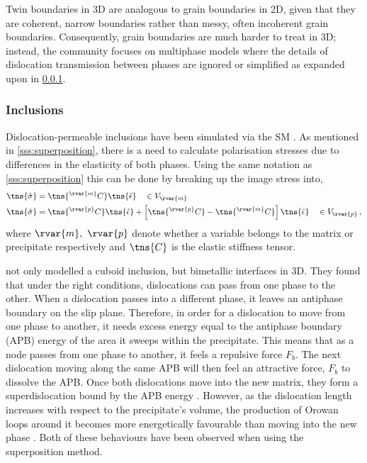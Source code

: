 Twin boundaries in 3D are analogous to grain boundaries in 2D, given that they are coherent, narrow boundaries rather than messy, often incoherent grain boundaries. Consequently, grain boundaries are much harder to treat in 3D; instead, the community focuses on multiphase models where the details of dislocation transmission between phases are ignored or simplified as expanded upon in \cref{sss:inclusions}.

\subsubsection{Inclusions}
\label{sss:inclusions}

Dislocation-permeable inclusions have been simulated via the SM \cite{sm_incl}. As mentioned in \cref{sss:superposition}, there is a need to calculate polarisation stresses due to differences in the elasticity of both phases. Using the same notation as \cref{sss:superposition} this can be done by breaking up the image stress into,
\begin{subequations}
    \begin{align}\label{eq:sm_pol_stress}
        \tns{\hat{\sigma}} & = \tns{^{\rvar{m}}C} \tns{\hat{\epsilon}} \quad \in V_{\rvar{m}}                                                                                  \\
        \tns{\hat{\sigma}} & = \tns{^{\rvar{p}}C} \tns{\hat{\epsilon}} + \left[\tns{^{\rvar{p}}C} - \tns{^{\rvar{m}}C}\right] \tns{\tilde{\epsilon}} \quad \in V_{\rvar{p}}\,,
    \end{align}
\end{subequations}
where $ \rvar{m},~\rvar{p} $ denote whether a variable belongs to the matrix or precipitate respectively and $ \tns{C} $ is the elastic stiffness tensor.

 not only modelled a cuboid inclusion, but bimetallic interfaces in 3D. They found that under the right conditions, dislocations can pass from one phase to the other. When a dislocation passes into a different phase, it leaves an antiphase boundary on the slip plane. Therefore, in order for a dislocation to move from one phase to another, it needs excess energy equal to the antiphase boundary (APB) energy of the area it sweeps within the precipitate. This means that as a node passes from one phase to another, it feels a repulsive force $ F_{b} $. The next dislocation moving along the same APB will then feel an attractive force, $ F_{b} $ to dissolve the APB. Once both dislocations move into the new matrix, they form a superdislocation bound by the APB energy \cite{apb}. However, as the dislocation length increases with respect to the precipitate's volume, the production of Orowan loops around it becomes more energetically favourable than moving into the new phase \cite{sm_incl, apb}. Both of these behaviours have been observed when using the superposition method.

